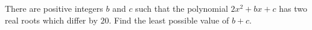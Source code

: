 There are positive integers $b$ and $c$ such that the polynomial $2x^2+bx+c$ has two real roots which differ by $20$. Find the least possible value of $b+c$.
